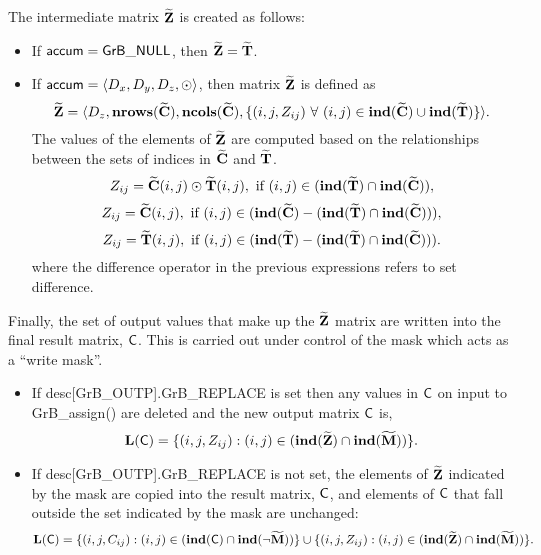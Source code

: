 The intermediate matrix ${\bf \widetilde{Z}}$ is created as follows:
\begin{itemize}
    \item If ${\sf accum} = {\sf GrB\_NULL}$, then 
    ${\bf \widetilde{Z}} = {\bf \widetilde{T}}$.

    \item If ${\sf accum} = \langle D_x, D_y, D_z, \odot \rangle$, then matrix 
    ${\bf \widetilde{Z}}$ is defined as 
        \[ 
        {\bf \widetilde{Z}} = 
        \langle D_z, \bold{nrows}({\bf \widetilde{C}}),
        \bold{ncols}({\bf \widetilde{C}}), 
	    \{(i,j,Z_{ij}) \ \forall \ (i,j) \in \bold{ind}({\bf \widetilde{C}}) \cup 
        \bold{ind}({\bf \widetilde{T}}) \} \rangle.\]
    The values of the elements of ${\bf \widetilde{Z}}$ are computed based on 
    the relationships between the sets of indices in ${\bf \widetilde{C}}$ and 
    ${\bf \widetilde{T}}$.
\[
	Z_{ij} = {\bf \widetilde{C}}(i,j) \odot {\bf \widetilde{T}}(i,j), 
    \mbox{~if~} (i,j) \in  (\bold{ind}({\bf \widetilde{T}}) \cap 
    \bold{ind}({\bf \widetilde{C}})),
\]
\[
	Z_{ij} = {\bf \widetilde{C}}(i,j), \mbox{~if~} (i,j) \in  
    (\bold{ind}({\bf \widetilde{C}}) - (\bold{ind}({\bf \widetilde{T}}) \cap 
    \bold{ind}({\bf \widetilde{C}}))),
\]
\[
	Z_{ij} = {\bf \widetilde{T}}(i,j), \mbox{~if~} (i,j) \in  
    (\bold{ind}({\bf \widetilde{T}}) - (\bold{ind}({\bf \widetilde{T}}) \cap 
    \bold{ind}({\bf \widetilde{C}}))).
\]
where the difference operator in the previous expressions refers to set difference.
\end{itemize}

Finally, the set of output values that make up the ${\bf \widetilde{Z}}$ 
matrix are written into the final result matrix, ${\sf C}$. 
This is carried out under control of the mask which acts as a ``write mask''.
\begin{itemize}
\item If {\sf desc[GrB\_OUTP].GrB\_REPLACE} is set then any values in ${\sf C}$ 
on input to {\sf GrB\_assign()} are deleted and the new output matrix ${\sf C}$ is,
		\[ \bold{L}({\sf C}) = \{(i,j,Z_{ij}) : (i,j) \in (\bold{ind}({\bf \widetilde{Z}}) 
\cap \bold{ind}({\bf \widetilde{M}})) \}. \]

\item If {\sf desc[GrB\_OUTP].GrB\_REPLACE} is not set, the elements of 
${\bf \widetilde{Z}}$ indicated by 
the mask are copied into the result matrix, ${\sf C}$, and elements of 
${\sf C}$ that fall outside the set indicated by the mask are unchanged:
		\[ \bold{L}({\sf C}) = \{(i,j,C_{ij}) : (i,j) \in (\bold{ind}({\bf \sf C}) 
		\cap \bold{ind}(\neg {\bf \widetilde{M}})) \} \cup \{(i,j,Z_{ij}) : (i,j) \in 
(\bold{ind}({\bf \widetilde{Z}}) \cap \bold{ind}({\bf \widetilde{M}})) \}. \]
\end{itemize}

